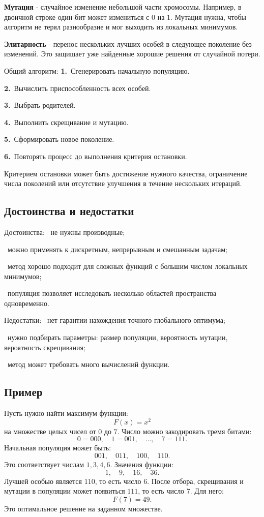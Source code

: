 \documentclass[12pt,a4paper]{article}
\begin{document}
\textbf{Мутация} - случайное изменение небольшой части хромосомы. Например, в двоичной строке один бит может измениться с $0$ на $1$. Мутация нужна, чтобы алгоритм не терял разнообразие и мог выходить из локальных минимумов.

\textbf{Элитарность} - перенос нескольких лучших особей в следующее поколение без изменений. Это защищает уже найденные хорошие решения от случайной потери.

Общий алгоритм:
\noindent\textbf{1.}\ Сгенерировать начальную популяцию.\par
\noindent\textbf{2.}\ Вычислить приспособленность всех особей.\par
\noindent\textbf{3.}\ Выбрать родителей.\par
\noindent\textbf{4.}\ Выполнить скрещивание и мутацию.\par
\noindent\textbf{5.}\ Сформировать новое поколение.\par
\noindent\textbf{6.}\ Повторять процесс до выполнения критерия остановки.\par

Критерием остановки может быть достижение нужного качества, ограничение числа поколений или отсутствие улучшения в течение нескольких итераций.

\subsection{Достоинства и недостатки}
Достоинства:
\noindent\textbullet\ не нужны производные;\par
\noindent\textbullet\ можно применять к дискретным, непрерывным и смешанным задачам;\par
\noindent\textbullet\ метод хорошо подходит для сложных функций с большим числом локальных минимумов;\par
\noindent\textbullet\ популяция позволяет исследовать несколько областей пространства одновременно.\par

Недостатки:
\noindent\textbullet\ нет гарантии нахождения точного глобального оптимума;\par
\noindent\textbullet\ нужно подбирать параметры: размер популяции, вероятность мутации, вероятность скрещивания;\par
\noindent\textbullet\ метод может требовать много вычислений функции.\par

\subsection{Пример}
Пусть нужно найти максимум функции:
\[
F(x)=x^2
\]
на множестве целых чисел от $0$ до $7$.
Число можно закодировать тремя битами:
\[
0=000,\quad 1=001,\quad \ldots,\quad 7=111.
\]
Начальная популяция может быть:
\[
001,\quad 011,\quad 100,\quad 110.
\]
Это соответствует числам $1,3,4,6$.
Значения функции:
\[
1,\quad 9,\quad 16,\quad 36.
\]
Лучшей особью является $110$, то есть число $6$. После отбора, скрещивания и мутации в популяции может появиться $111$, то есть число $7$. Для него:
\[
F(7)=49.
\]
Это оптимальное решение на заданном множестве.
\end{document}
